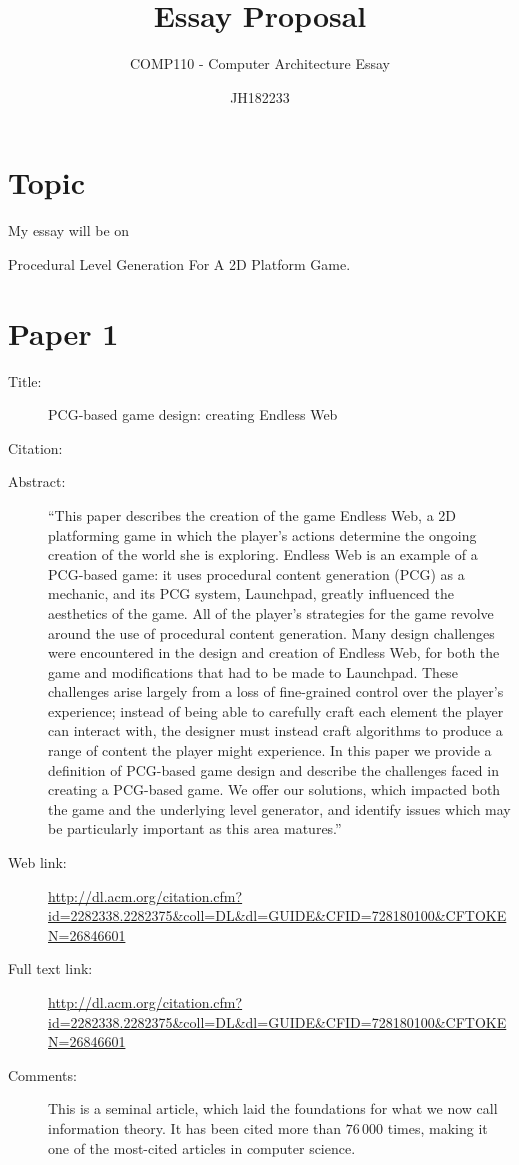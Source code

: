 \documentclass{scrartcl}
\title{Essay Proposal}
\subtitle{COMP110 - Computer Architecture Essay}
\author{JH182233}
\begin{document}
\maketitle

\section*{Topic}

My essay will be on

Procedural Level Generation For A 2D Platform Game.

\section*{Paper 1}
\begin{description}
\item[Title:] PCG-based game design: creating Endless Web
\item[Citation:] \cite{web}
\item[Abstract:] ``This paper describes the creation of the game Endless Web, a 2D platforming game in which the player's actions determine the ongoing creation of the world she is exploring. Endless Web is an example of a PCG-based game: it uses procedural content generation (PCG) as a mechanic, and its PCG system, Launchpad, greatly influenced the aesthetics of the game. All of the player's strategies for the game revolve around the use of procedural content generation. Many design challenges were encountered in the design and creation of Endless Web, for both the game and modifications that had to be made to Launchpad. These challenges arise largely from a loss of fine-grained control over the player's experience; instead of being able to carefully craft each element the player can interact with, the designer must instead craft algorithms to produce a range of content the player might experience. In this paper we provide a definition of PCG-based game design and describe the challenges faced in creating a PCG-based game. We offer our solutions, which impacted both the game and the underlying level generator, and identify issues which may be particularly important as this area matures.''
\item[Web link:] \url{http://dl.acm.org/citation.cfm?id=2282338.2282375&coll=DL&dl=GUIDE&CFID=728180100&CFTOKEN=26846601}
\item[Full text link:] \url{http://dl.acm.org/citation.cfm?id=2282338.2282375&coll=DL&dl=GUIDE&CFID=728180100&CFTOKEN=26846601}
\item[Comments:] This is a seminal article, which laid the foundations for what we now call information theory.
	It has been cited more than $76\,000$ times, making it one of the most-cited articles in computer science.
\end{description}
\end{document}
